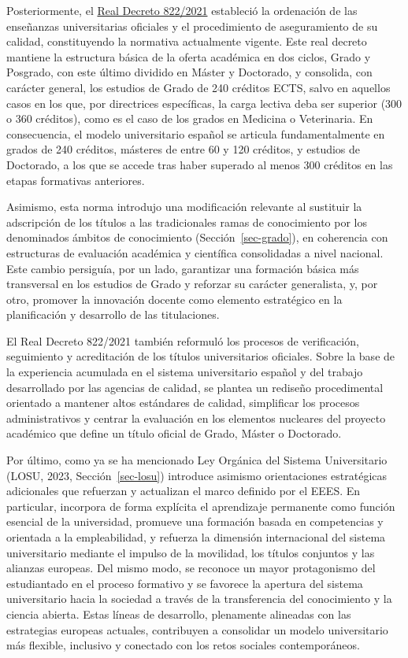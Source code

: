 \documentclass[
  11pt,
  a4paper,
  twoside]{scrreprt}
\begin{document}
Posteriormente, el
\href{https://www.boe.es/buscar/doc.php?id=BOE-A-2021-15781}{Real
Decreto 822/2021} estableció la ordenación de las enseñanzas
universitarias oficiales y el procedimiento de aseguramiento de su
calidad, constituyendo la normativa actualmente vigente. Este real
decreto mantiene la estructura básica de la oferta académica en dos
ciclos, Grado y Posgrado, con este último dividido en Máster y
Doctorado, y consolida, con carácter general, los estudios de Grado de
240 créditos ECTS, salvo en aquellos casos en los que, por directrices
específicas, la carga lectiva deba ser superior (300 o 360 créditos),
como es el caso de los grados en Medicina o Veterinaria. En
consecuencia, el modelo universitario español se articula
fundamentalmente en grados de 240 créditos, másteres de entre 60 y 120
créditos, y estudios de Doctorado, a los que se accede tras haber
superado al menos 300 créditos en las etapas formativas anteriores.

Asimismo, esta norma introdujo una modificación relevante al sustituir
la adscripción de los títulos a las tradicionales ramas de conocimiento
por los denominados ámbitos de conocimiento (Sección~\ref{sec-grado}),
en coherencia con estructuras de evaluación académica y científica
consolidadas a nivel nacional. Este cambio persiguía, por un lado,
garantizar una formación básica más transversal en los estudios de Grado
y reforzar su carácter generalista, y, por otro, promover la innovación
docente como elemento estratégico en la planificación y desarrollo de
las titulaciones.

El Real Decreto 822/2021 también reformuló los procesos de verificación,
seguimiento y acreditación de los títulos universitarios oficiales.
Sobre la base de la experiencia acumulada en el sistema universitario
español y del trabajo desarrollado por las agencias de calidad, se
plantea un rediseño procedimental orientado a mantener altos estándares
de calidad, simplificar los procesos administrativos y centrar la
evaluación en los elementos nucleares del proyecto académico que define
un título oficial de Grado, Máster o Doctorado.

Por último, como ya se ha mencionado Ley Orgánica del Sistema
Universitario (LOSU, 2023, Sección~\ref{sec-losu}) introduce asimismo
orientaciones estratégicas adicionales que refuerzan y actualizan el
marco definido por el EEES. En particular, incorpora de forma explícita
el aprendizaje permanente como función esencial de la universidad,
promueve una formación basada en competencias y orientada a la
empleabilidad, y refuerza la dimensión internacional del sistema
universitario mediante el impulso de la movilidad, los títulos conjuntos
y las alianzas europeas. Del mismo modo, se reconoce un mayor
protagonismo del estudiantado en el proceso formativo y se favorece la
apertura del sistema universitario hacia la sociedad a través de la
transferencia del conocimiento y la ciencia abierta. Estas líneas de
desarrollo, plenamente alineadas con las estrategias europeas actuales,
contribuyen a consolidar un modelo universitario más flexible, inclusivo
y conectado con los retos sociales contemporáneos.
\end{document}
